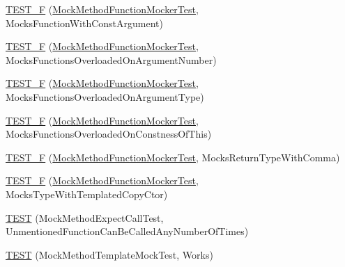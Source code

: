 \begin{DoxyCompactItemize}
\item 
\mbox{\hyperlink{namespacetesting_1_1gmock__function__mocker__test_ad1ec731c33bee156a56536aa26dd9441}{T\+E\+S\+T\+\_\+F}} (\mbox{\hyperlink{classtesting_1_1gmock__function__mocker__test_1_1_mock_method_function_mocker_test}{Mock\+Method\+Function\+Mocker\+Test}}, Mocks\+Function\+With\+Const\+Argument)
\item 
\mbox{\hyperlink{namespacetesting_1_1gmock__function__mocker__test_a5292d0a0d949ed39564f82149fa5c022}{T\+E\+S\+T\+\_\+F}} (\mbox{\hyperlink{classtesting_1_1gmock__function__mocker__test_1_1_mock_method_function_mocker_test}{Mock\+Method\+Function\+Mocker\+Test}}, Mocks\+Functions\+Overloaded\+On\+Argument\+Number)
\item 
\mbox{\hyperlink{namespacetesting_1_1gmock__function__mocker__test_a0da05f5bda501f5b86249eddc2f1d4b0}{T\+E\+S\+T\+\_\+F}} (\mbox{\hyperlink{classtesting_1_1gmock__function__mocker__test_1_1_mock_method_function_mocker_test}{Mock\+Method\+Function\+Mocker\+Test}}, Mocks\+Functions\+Overloaded\+On\+Argument\+Type)
\item 
\mbox{\hyperlink{namespacetesting_1_1gmock__function__mocker__test_a25b8c84174c3773f52bba3f15f3bb180}{T\+E\+S\+T\+\_\+F}} (\mbox{\hyperlink{classtesting_1_1gmock__function__mocker__test_1_1_mock_method_function_mocker_test}{Mock\+Method\+Function\+Mocker\+Test}}, Mocks\+Functions\+Overloaded\+On\+Constness\+Of\+This)
\item 
\mbox{\hyperlink{namespacetesting_1_1gmock__function__mocker__test_a7761cd0e2989b3f40b8e5cdf118a1570}{T\+E\+S\+T\+\_\+F}} (\mbox{\hyperlink{classtesting_1_1gmock__function__mocker__test_1_1_mock_method_function_mocker_test}{Mock\+Method\+Function\+Mocker\+Test}}, Mocks\+Return\+Type\+With\+Comma)
\item 
\mbox{\hyperlink{namespacetesting_1_1gmock__function__mocker__test_a1cebea8200248ab7277dedb21f245a5a}{T\+E\+S\+T\+\_\+F}} (\mbox{\hyperlink{classtesting_1_1gmock__function__mocker__test_1_1_mock_method_function_mocker_test}{Mock\+Method\+Function\+Mocker\+Test}}, Mocks\+Type\+With\+Templated\+Copy\+Ctor)
\item 
\mbox{\hyperlink{namespacetesting_1_1gmock__function__mocker__test_a8f4b0e0a16f93fdd615ee3a793a0f4f0}{T\+E\+ST}} (Mock\+Method\+Expect\+Call\+Test, Unmentioned\+Function\+Can\+Be\+Called\+Any\+Number\+Of\+Times)
\item 
\mbox{\hyperlink{namespacetesting_1_1gmock__function__mocker__test_a3b97782f7265abf757aa472b6dbe4972}{T\+E\+ST}} (Mock\+Method\+Template\+Mock\+Test, Works)

\end{DoxyCompactItemize}
